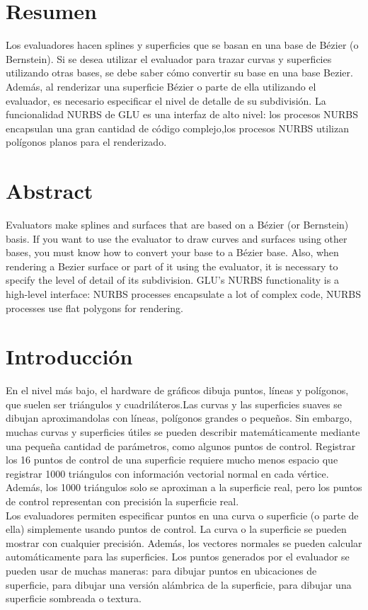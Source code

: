 \section{Resumen}
Los evaluadores hacen splines y superficies que se basan en una base de Bézier (o Bernstein). Si se desea utilizar el evaluador para trazar curvas y superficies utilizando otras bases, se debe saber cómo convertir su base en una base Bezier. Además, al renderizar una superficie Bézier o parte de ella utilizando el evaluador, es necesario especificar el nivel de detalle de su subdivisión. La funcionalidad NURBS de  GLU es una interfaz de alto nivel: los procesos NURBS encapsulan una gran cantidad de código complejo,los procesos NURBS utilizan polígonos planos para el renderizado.

\section{Abstract}
Evaluators make splines and surfaces that are based on a Bézier (or Bernstein) basis. If you want to use the evaluator to draw curves and surfaces using other bases, you must know how to convert your base to a Bézier base. Also, when rendering a Bezier surface or part of it using the evaluator, it is necessary to specify the level of detail of its subdivision. GLU's NURBS functionality is a high-level interface: NURBS processes encapsulate a lot of complex code, NURBS processes use flat polygons for rendering.

\section{Introducción}
En el nivel más bajo, el hardware de gráficos dibuja puntos, líneas y polígonos, que suelen ser triángulos y cuadriláteros.Las curvas y las superficies suaves se dibujan aproximandolas con líneas, polígonos grandes  o pequeños. Sin embargo, muchas curvas y superficies útiles se pueden describir matemáticamente mediante una pequeña cantidad de parámetros, como algunos puntos de control. Registrar los 16 puntos de control de una superficie requiere mucho menos espacio que registrar 1000 triángulos  con  información vectorial normal en cada vértice. Además, los 1000 triángulos solo se aproximan a la superficie real, pero los puntos de control representan con precisión la superficie real. \\

Los evaluadores permiten especificar puntos en una curva o superficie (o parte de ella) simplemente usando puntos de control. La curva o la superficie se pueden mostrar con cualquier precisión. Además, los vectores normales se pueden calcular automáticamente para las superficies. Los puntos generados por el evaluador se pueden usar de muchas maneras: para dibujar puntos en ubicaciones de superficie, para dibujar una versión alámbrica de la superficie, para dibujar una superficie sombreada o textura.\\


